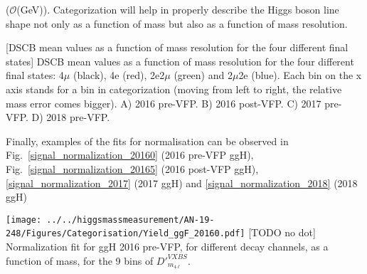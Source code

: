 ($\mathcal{O}$({GeV})). Categorization will help in properly describe the Higgs boson line shape
not only as a function of mass but also as a function of mass resolution.
\begin{multiFigure}
    \centering
        [DSCB mean values as a function of mass resolution for the four different final states]
        {DSCB mean values as a function of mass resolution for the four different final states: 4$\mu$ (black),
        4e (red), 2e2$\mu$ (green) and 2$\mu$2e (blue). Each bin on the x axis stands for a bin 
        in categorization (moving from left to right, the relative mass error comes bigger). 
        \;A) 2016 pre-VFP.
        \;B) 2016 post-VFP.
        \;C) 2017 pre-VFP.
        \;D) 2018 pre-VFP.}
    \label{MeanDependence}
\end{multiFigure}
Finally, examples of the fits for normalisation can be observed in 
Fig.~\ref{signal_normalization_20160} (2016 pre-VFP ggH),
Fig.~\ref{signal_normalization_20165} (2016 post-VFP ggH), 
\ref{signal_normalization_2017} (2017 ggH) and 
\ref{signal_normalization_2018} (2018 ggH)
\begin{multiFigure}
    \centering
        \texttt{[image: ../../higgsmassmeasurement/AN-19-248/Figures/Categorisation/Yield\_ggF\_20160.pdf]}
        [TODO no dot]
        {Normalization fit for ggH 2016 pre-VFP, for different decay channels, as a function of mass, for the 9 bins of $D'^{VXBS}_{m_{4\ell}}$.}
    \label{signal_normalization_20160}
\end{multiFigure}
